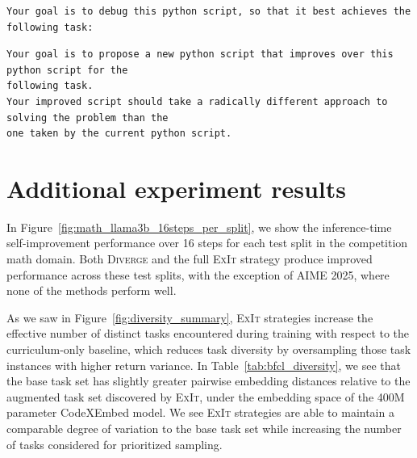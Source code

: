 \documentclass[10pt]{article} %
\newcommand{\methodname}{\textsc{ExIt}}
\begin{document}
\begin{promptbox}[title=MLE-bench debug goal preamble, colbacktitle=orange!90!black, colframe=orange!90!black,
colback=gray!5]
\small
\begin{verbatim}
Your goal is to debug this python script, so that it best achieves the following task:
\end{verbatim}
\end{promptbox}

\begin{promptbox}[title=MLE-bench diverge goal preamble, colbacktitle=MediumOrchid!90!black, colframe=MediumOrchid!90!black,
colback=gray!5]
\small
\begin{verbatim}
Your goal is to propose a new python script that improves over this python script for the
following task.
Your improved script should take a radically different approach to solving the problem than the
one taken by the current python script.
\end{verbatim}
\end{promptbox}

\clearpage
\newpage

\section{Additional experiment results}
\label{app:additional_results}

In Figure~\ref{fig:math_llama3b_16steps_per_split}, we show the inference-time self-improvement performance over 16 steps for each test split in the competition math domain. Both \textsc{Diverge} and the full \methodname{} strategy produce improved performance across these test splits, with the exception of AIME 2025, where none of the methods perform well.

As we saw in Figure~\ref{fig:diversity_summary}, \methodname{} strategies increase the effective number of distinct tasks encountered during training with respect to the curriculum-only baseline, which reduces task diversity by oversampling those task instances with higher return variance. In Table~\ref{tab:bfcl_diversity}, we see that the base task set has slightly greater pairwise embedding distances relative to the augmented task set discovered by \methodname{}, under the embedding space of the 400M parameter CodeXEmbed model. We see \methodname{} strategies are able to maintain a comparable degree of variation to the base task set while increasing the number of tasks considered for prioritized sampling.
\end{document}
